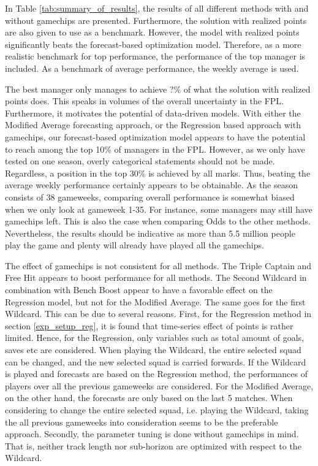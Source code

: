 In Table \ref{tab:summary_of_results}, the results of all different methods with and without gamechips are presented. Furthermore, the solution with realized points are also given to use as a benchmark. However, the model with realized points significantly beats the forecast-based optimization model. Therefore, as a more realistic benchmark for top performance, the performance of the top manager is included. As a benchmark of average performance, the weekly average is used.

\newpar

The best manager only manages to achieve ?\% of what the solution with realized points does. This speaks in volumes of the overall uncertainty in the FPL. Furthermore, it motivates the potential of data-driven models. With either the Modified Average forecasting approach, or the Regression based approach with gamechips, our forecast-based optimization model appears to have the potential to reach among the top 10\% of managers in the FPL. However, as we only have tested on one season, overly categorical statements should not be made. Regardless, a position in the top 30\% is achieved by all marks. Thus, beating the average weekly performance certainly appears to be obtainable. As the season consists of 38 gameweeks, comparing overall performance is somewhat biased when we only look at gameweek 1-35. For instance, some managers may still have gamechips left. This is also the case when comparing Odds to the other methods. Nevertheless, the results should be indicative as more than 5.5 million people play the game and plenty will already have played all the gamechips.

\newpar

The effect of gamechips is not consistent for all methods. The Triple Captain and Free Hit appears to boost performance for all methods. The Second Wildcard in combination with Bench Boost appear to have a favorable effect on the Regression model, but not for the Modified Average. The same goes for the first Wildcard. This can be due to several reasons. First, for the Regression method in section \ref{exp_setup_reg}, it is found that time-series effect of points is rather limited. Hence, for the Regression, only variables such as total amount of goals, saves etc are considered. When playing the Wildcard, the entire selected squad can be changed, and the new selected squad is carried forwards. If the Wildcard is played and forecasts are based on the Regression method, the performances of players over all the previous gameweeks are considered. For the Modified Average, on the other hand, the forecasts are only based on the last 5 matches. When considering to change the entire selected squad, i.e. playing the Wildcard, taking the all previous gameweeks into consideration seems to be the preferable approach. Secondly, the parameter tuning is done without gamechips in mind. That is, neither track length nor sub-horizon are optimized with respect to the Wildcard.

